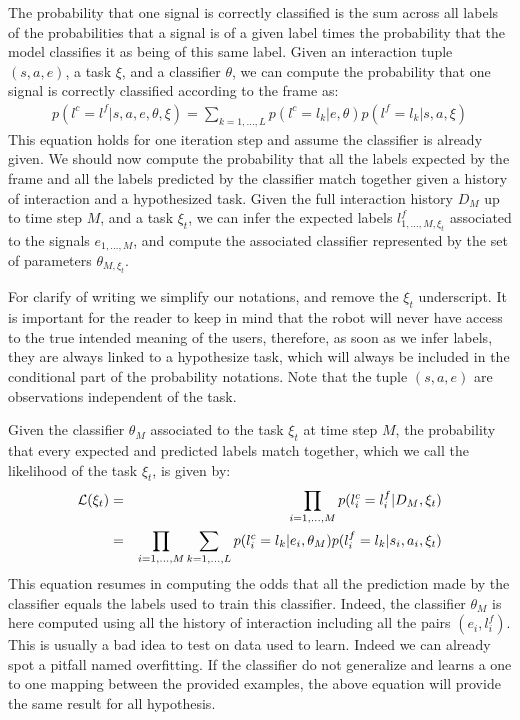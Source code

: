 The probability that one signal is correctly classified is the sum across all labels of the probabilities that a signal is of a given label times the probability that the model classifies it as being of this same label. Given an interaction tuple $(s,a,e)$, a task $\xi$, and a classifier $\theta$, we can compute the probability that one signal is correctly classified according to the frame as:
%
\begin{eqnarray}
p(l^c = l^f | s, a, e, \theta, \xi) = \sum_{k = 1, \ldots, L} p(l^c = l_k | e, \theta) p(l^f = l_k | s, a, \xi)
\end{eqnarray}
%
This equation holds for one iteration step and assume the classifier is already given.  We should now compute the probability that all the labels expected by the frame and all the labels predicted by the classifier match together given a history of interaction and a hypothesized task. Given the full interaction history $D_M$ up to time step $M$, and a task $\xi_t$, we can infer the expected labels $l^f_{1,\ldots,M, \xi_t}$ associated to the signals $e_{1,\ldots,M}$, and compute the associated classifier represented by the set of parameters $\theta_{M, \xi_t}$. 

For clarify of writing we simplify our notations, and remove the $\xi_t$ underscript. It is important for the reader to keep in mind that the robot will never have access to the true intended meaning of the users, therefore, as soon as we infer labels, they are always linked to a hypothesize task, which will always be included in the conditional part of the probability notations. Note that the tuple $(s, a, e)$ are observations independent of the task.

Given the classifier $\theta_M$ associated to the task $\xi_t$ at time step $M$, the probability that every expected and predicted labels match together, which we call the likelihood of the task $\xi_t$, is given by:
%
\begin{eqnarray}
\mathcal{L}(\xi_t) &=& \prod_{i = 1,\ldots,M} p(l^c_i = l^f_i | D_M, \xi_t) \nonumber \\ 
&=& \prod_{i = 1,\ldots,M} \sum_{k = 1, \ldots, L} p(l^c_i = l_k | e_i, \theta_M) p(l^f_i = l_k | s_i, a_i, \xi_t)
\label{eq:matchingoverfitting} 
\end{eqnarray}
%
This equation resumes in computing the odds that all the prediction made by the classifier equals the labels used to train this classifier. Indeed, the classifier $\theta_{M}$ is here computed using all the history of interaction including all the pairs $(e_i, l^f_i)$. This is usually a bad idea to test on data used to learn. Indeed we can already spot a pitfall named overfitting. If the classifier do not generalize and learns a one to one mapping between the provided examples, the above equation will provide the same result for all hypothesis. 

